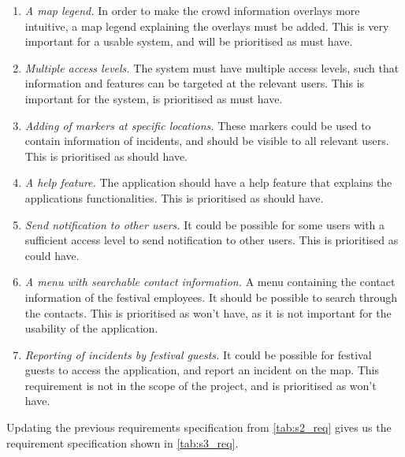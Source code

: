 \begin{enumerate}
    \item \emph{A map legend.} In order to make the crowd information overlays more intuitive, a map legend explaining the overlays must be added. This is very important for a usable system, and will be prioritised as must have.
    \item \emph{Multiple access levels.} The system must have multiple access levels, such that information and features can be targeted at the relevant users. This is important for the system, is prioritised as must have.
    \item \emph{Adding of markers at specific locations.} These markers could be used to contain information of incidents, and should be visible to all relevant users. This is prioritised as should have.
    \item \emph{A help feature.} The application should have a help feature that explains the applications functionalities. This is prioritised as should have.
    \item \emph{Send notification to other users.} It could be possible for some users with a sufficient access level to send notification to other users. This is prioritised as could have.
    \item \emph{A menu with searchable contact information.} A menu containing the contact information of the festival employees. It should be possible to search through the contacts. This is prioritised as won't have, as it is not important for the usability of the application.
    \item \emph{Reporting of incidents by festival guests.} It could be possible for festival guests to access the application, and report an incident on the map. This requirement is not in the scope of the project, and is prioritised as won't have.
\end{enumerate}

Updating the previous requirements specification from \cref{tab:s2_req} gives us the requirement specification shown in \cref{tab:s3_req}.

